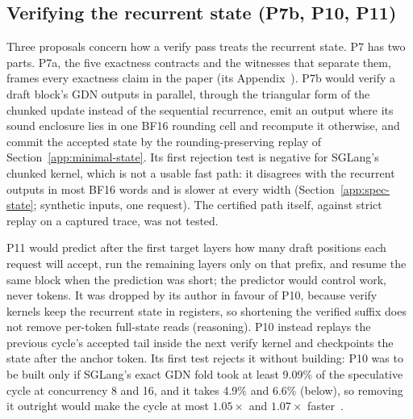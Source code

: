 \subsection{Verifying the recurrent state (P7b, P10, P11)}\label{app:verify-state}
Three proposals concern how a verify pass treats the recurrent state. P7 has two parts. P7a, the five exactness contracts and the witnesses that separate them, frames every exactness claim in the paper (its Appendix~). P7b would verify a draft block's GDN outputs in parallel, through the triangular form of the chunked update instead of the sequential recurrence, emit an output where its sound enclosure lies in one BF16 rounding cell and recompute it otherwise, and commit the accepted state by the rounding-preserving replay of Section~\ref{app:minimal-state}. Its first rejection test is negative for SGLang's chunked kernel, which is not a usable fast path: it disagrees with the recurrent outputs in most BF16 words and is slower at every width (Section~\ref{app:spec-state}; synthetic inputs, one request). The certified path itself, against strict replay on a captured trace, was not tested.

P11 would predict after the first target layers how many draft positions each request will accept, run the remaining layers only on that prefix, and resume the same block when the prediction was short; the predictor would control work, never tokens. It was dropped by its author in favour of P10, because verify kernels keep the recurrent state in registers, so shortening the verified suffix does not remove per-token full-state reads (reasoning). P10 instead replays the previous cycle's accepted tail inside the next verify kernel and checkpoints the state after the anchor token. Its first test rejects it without building: P10 was to be built only if SGLang's exact GDN fold took at least 9.09\% of the speculative cycle at concurrency 8 and 16, and it takes 4.9\% and 6.6\% (below), so removing it outright would make the cycle at most $1.05\times$ and $1.07\times$ faster~.

